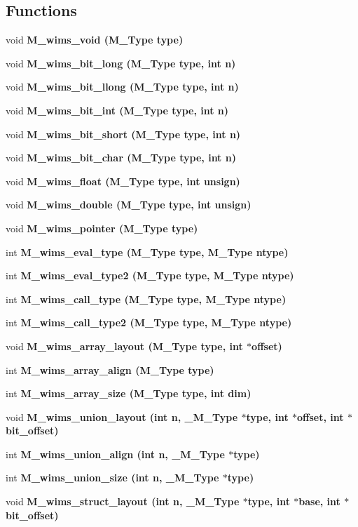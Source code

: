 \subsection*{Functions}
\begin{CompactItemize}
\item 
void \bf{M\_\-wims\_\-void} (\bf{M\_\-Type} type)
\item 
void \bf{M\_\-wims\_\-bit\_\-long} (\bf{M\_\-Type} type, int n)
\item 
void \bf{M\_\-wims\_\-bit\_\-llong} (\bf{M\_\-Type} type, int n)
\item 
void \bf{M\_\-wims\_\-bit\_\-int} (\bf{M\_\-Type} type, int n)
\item 
void \bf{M\_\-wims\_\-bit\_\-short} (\bf{M\_\-Type} type, int n)
\item 
void \bf{M\_\-wims\_\-bit\_\-char} (\bf{M\_\-Type} type, int n)
\item 
void \bf{M\_\-wims\_\-float} (\bf{M\_\-Type} type, int unsign)
\item 
void \bf{M\_\-wims\_\-double} (\bf{M\_\-Type} type, int unsign)
\item 
void \bf{M\_\-wims\_\-pointer} (\bf{M\_\-Type} type)
\item 
int \bf{M\_\-wims\_\-eval\_\-type} (\bf{M\_\-Type} type, \bf{M\_\-Type} ntype)
\item 
int \bf{M\_\-wims\_\-eval\_\-type2} (\bf{M\_\-Type} type, \bf{M\_\-Type} ntype)
\item 
int \bf{M\_\-wims\_\-call\_\-type} (\bf{M\_\-Type} type, \bf{M\_\-Type} ntype)
\item 
int \bf{M\_\-wims\_\-call\_\-type2} (\bf{M\_\-Type} type, \bf{M\_\-Type} ntype)
\item 
void \bf{M\_\-wims\_\-array\_\-layout} (\bf{M\_\-Type} type, int $\ast$offset)
\item 
int \bf{M\_\-wims\_\-array\_\-align} (\bf{M\_\-Type} type)
\item 
int \bf{M\_\-wims\_\-array\_\-size} (\bf{M\_\-Type} type, int dim)
\item 
void \bf{M\_\-wims\_\-union\_\-layout} (int n, \bf{\_\-M\_\-Type} $\ast$type, int $\ast$offset, int $\ast$bit\_\-offset)
\item 
int \bf{M\_\-wims\_\-union\_\-align} (int n, \bf{\_\-M\_\-Type} $\ast$type)
\item 
int \bf{M\_\-wims\_\-union\_\-size} (int n, \bf{\_\-M\_\-Type} $\ast$type)
\item 
void \bf{M\_\-wims\_\-struct\_\-layout} (int n, \bf{\_\-M\_\-Type} $\ast$type, int $\ast$base, int $\ast$bit\_\-offset)

\end{CompactItemize}
